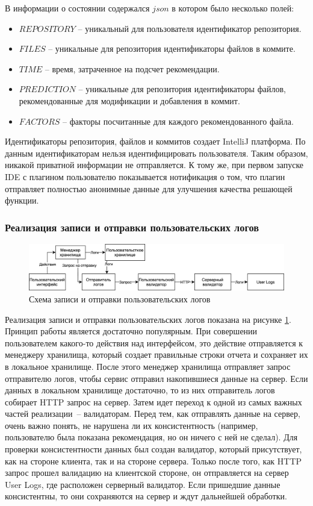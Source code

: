 В информации о состоянии содержался $json$ в котором было несколько полей:
    \begin{itemize}[label={\textbullet}]
        \item $REPOSITORY$ -- уникальный для пользователя идентификатор репозитория.
        \item $FILES$ -- уникальные для репозитория идентификаторы файлов в коммите.
        \item $TIME$ -- время, затраченное на подсчет рекомендации.
        \item $PREDICTION$ -- уникальные для репозитория идентификаторы файлов, рекомендованные для модификации и добавления в коммит.
        \item $FACTORS$ -- факторы посчитанные для каждого рекомендованного файла.
    \end{itemize}
Идентификаторы репозитория, файлов и коммитов создает IntelliJ платформа. По данным идентификаторам нельзя идентифицировать пользователя. Таким образом, никакой приватной информации не отправляется. К тому же, при первом запуске IDE с плагином пользователю показывается нотификация о том, что плагин отправляет полностью анонимные данные для улучшения качества решающей функции.
\subsubsection{Реализация записи и отправки пользовательских логов}
\begin{figure}[!h]
\caption{Схема записи и отправки пользовательских логов}\label{jet-stat-logs}
\centering
\includegraphics[scale=0.15]{images/User Logs.png}
\end{figure}
Реализация записи и отправки пользовательских логов показана на рисунке \ref{jet-stat-logs}. Принцип работы является достаточно популярным. При совершении пользователем какого-то действия над интерфейсом, это действие отправляется к менеджеру хранилища, который создает правильные строки отчета и сохраняет их в локальное хранилище. После этого менеджер хранилища отправляет запрос отправителю логов, чтобы сервис отправил накопившиеся данные на сервер. Если данных в локальном хранилище достаточно, то из них отправитель логов собирает HTTP запрос на сервер. Затем идет переход к одной из самых важных частей реализации~-- валидаторам. Перед тем, как отправлять данные на сервер, очень важно понять, не нарушена ли их консистентность (например, пользователю была показана рекомендация, но он ничего с ней не сделал). Для проверки консистентности данных был создан валидатор, который присутствует, как на стороне клиента, так и на стороне сервера. Только после того, как HTTP запрос прошел валидацию на клиентской стороне, он отправляется на сервер User Logs, где расположен серверный валидатор. Если пришедшие данные консистентны, то они сохраняются на сервер и ждут дальнейшей обработки.
